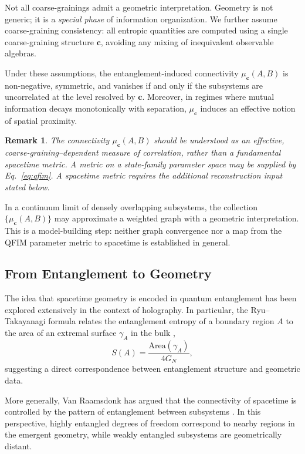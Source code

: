 \documentclass[12pt,a4paper]{article}
\newtheorem{remark}[theorem]{Remark}
\begin{document}
Not all coarse-grainings admit a geometric interpretation. 
Geometry is not generic; it is a \emph{special phase} of information organization.
We further assume coarse-graining consistency: all entropic quantities are computed using a single coarse-graining structure $\mathbf{c}$, avoiding any mixing of inequivalent observable algebras.

Under these assumptions, the entanglement-induced connectivity $\mu_{\mathbf{c}}(A,B)$ is non-negative, symmetric, and vanishes if and only if the subsystems are uncorrelated at the level resolved by $\mathbf{c}$.
Moreover, in regimes where mutual information decays monotonically with separation, $\mu_{\mathbf{c}}$ induces an effective notion of spatial proximity.

\begin{remark}
The connectivity $\mu_{\mathbf{c}}(A,B)$ should be understood as an \emph{effective, coarse-graining--dependent measure of correlation}, rather than a fundamental spacetime metric.
A metric on a state-family parameter space may be supplied by Eq.~\eqref{eq:qfim}.  A spacetime metric requires the additional reconstruction input stated below.
\end{remark}

In a continuum limit of densely overlapping subsystems, the collection $\{\mu_{\mathbf{c}}(A,B)\}$ may approximate a weighted graph with a geometric interpretation.  This is a model-building step: neither graph convergence nor a map from the QFIM parameter metric to spacetime is established in general.

\subsection{From Entanglement to Geometry}

The idea that spacetime geometry is encoded in quantum entanglement has been explored extensively in the context of holography.
In particular, the Ryu--Takayanagi formula relates the entanglement entropy of a boundary region $A$ to the area of an extremal surface $\gamma_A$ in the bulk \cite{RyuTakayanagi2006},
\begin{equation}
S(A) = \frac{\mathrm{Area}(\gamma_A)}{4G_N},
\end{equation}
suggesting a direct correspondence between entanglement structure and geometric data.

More generally, Van Raamsdonk has argued that the connectivity of spacetime is controlled by the pattern of entanglement between subsystems \cite{VanRaamsdonk2010}.
In this perspective, highly entangled degrees of freedom correspond to nearby regions in the emergent geometry, while weakly entangled subsystems are geometrically distant.
\end{document}
